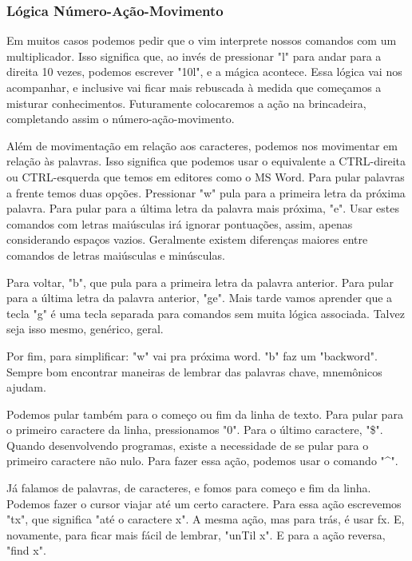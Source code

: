 \documentclass[a4paper, 12pt]{article}
\begin{document}
\subsubsection{Lógica Número-Ação-Movimento}
Em muitos casos podemos pedir que o vim interprete nossos comandos com um multiplicador.
Isso significa que, ao invés de pressionar "l" para andar para a direita 10 vezes, podemos escrever "10l", e a mágica acontece.
Essa lógica vai nos acompanhar, e inclusive vai ficar mais rebuscada à medida que começamos a misturar conhecimentos.
Futuramente colocaremos a ação na brincadeira, completando assim o número-ação-movimento.


Além de movimentação em relação aos caracteres, podemos nos movimentar em relação às palavras.
Isso significa que podemos usar o equivalente a CTRL-direita ou CTRL-esquerda que temos em editores como o MS Word.
Para pular palavras a frente temos duas opções.
Pressionar "w" pula para a primeira letra da próxima palavra.
Para pular para a última letra da palavra mais próxima, "e".
Usar estes comandos com letras maiúsculas irá ignorar pontuações, assim, apenas considerando espaços vazios.
Geralmente existem diferenças maiores entre comandos de letras maiúsculas e minúsculas.

Para voltar, "b", que pula para a primeira letra da palavra anterior.
Para pular para a última letra da palavra anterior, "ge".
Mais tarde vamos aprender que a tecla "g" é uma tecla separada para comandos sem muita lógica associada.
Talvez seja isso mesmo, genérico, geral.

Por fim, para simplificar: "w" vai pra próxima word. "b" faz um "backword".
Sempre bom encontrar maneiras de lembrar das palavras chave, mnemônicos ajudam.

Podemos pular também para o começo ou fim da linha de texto.
Para pular para o primeiro caractere da linha, pressionamos "0".
Para o último caractere, "\$".
Quando desenvolvendo programas, existe a necessidade de se pular para o primeiro caractere não nulo.
Para fazer essa ação, podemos usar o comando "\textbf{\^}".

Já falamos de palavras, de caracteres, e fomos para começo e fim da linha.
Podemos fazer o cursor viajar até um certo caractere.
Para essa ação escrevemos "tx", que significa "até o caractere x".
A mesma ação, mas para trás, é usar fx.
E, novamente, para ficar mais fácil de lembrar, "unTil x".
E para a ação reversa, "find x".
\end{document}
